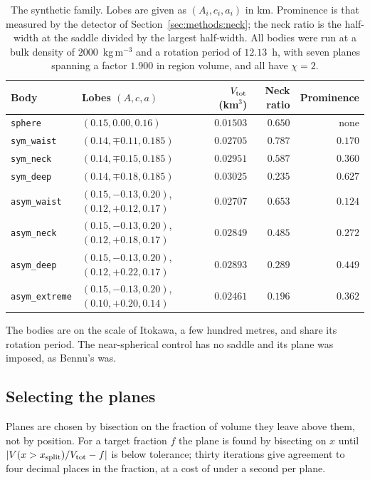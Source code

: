 \begin{table}[htbp]
\centering
\small
\caption{The synthetic family. Lobes are given as $(A_i, c_i, a_i)$ in km.
Prominence is that measured by the detector of
Section~\ref{sec:methods:neck}; the neck ratio is the half-width at the saddle
divided by the largest half-width. All bodies were run at a bulk density of
$2000$~kg\,m$^{-3}$ and a rotation period of $12.13$~h, with seven planes
spanning a factor $1.900$ in region volume, and all have $\chi = 2$.}
\label{tab:appsynth}
\begin{tabular}{llrrr}
\toprule
Body & Lobes $(A, c, a)$ & $V_{\mathrm{tot}}$ (km$^3$) & Neck ratio & Prominence \\
\midrule
\texttt{sphere} & $(0.15, 0.00, 0.16)$ & $0.01503$ & $0.650$ & none \\
\addlinespace
\texttt{sym\_waist} & $(0.14, \mp0.11, 0.185)$ & $0.02705$ & $0.787$ & $0.170$ \\
\texttt{sym\_neck} & $(0.14, \mp0.15, 0.185)$ & $0.02951$ & $0.587$ & $0.360$ \\
\texttt{sym\_deep} & $(0.14, \mp0.18, 0.185)$ & $0.03025$ & $0.235$ & $0.627$ \\
\addlinespace
\texttt{asym\_waist} & $(0.15, -0.13, 0.20)$, $(0.12, +0.12, 0.17)$ & $0.02707$ & $0.653$ & $0.124$ \\
\texttt{asym\_neck} & $(0.15, -0.13, 0.20)$, $(0.12, +0.18, 0.17)$ & $0.02849$ & $0.485$ & $0.272$ \\
\texttt{asym\_deep} & $(0.15, -0.13, 0.20)$, $(0.12, +0.22, 0.17)$ & $0.02893$ & $0.289$ & $0.449$ \\
\texttt{asym\_extreme} & $(0.15, -0.13, 0.20)$, $(0.10, +0.20, 0.14)$ & $0.02461$ & $0.196$ & $0.362$ \\
\bottomrule
\end{tabular}
\end{table}

The bodies are on the scale of Itokawa, a few hundred metres, and share its
rotation period. The near-spherical control has no saddle and its plane was
imposed, as Bennu's was.

\subsection{Selecting the planes}
\label{app:synth:planes}

Planes are chosen by bisection on the fraction of volume they leave above them,
not by position. For a target fraction $f$ the plane is found by bisecting on
$x$ until $\lvert V(x > x_{\mathrm{split}})/V_{\mathrm{tot}} - f \rvert$ is below tolerance; thirty
iterations give agreement to four decimal places in the fraction, at a cost of
under a second per plane.

